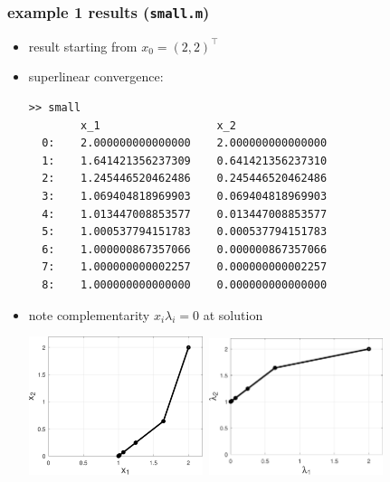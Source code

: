 \documentclass[10pt,hyperref,dvipsnames]{beamer}
\begin{document}
\begin{frame}[fragile]
\frametitle{example 1 results (\texttt{small.m})}

\begin{itemize}
\item result starting from $x_0=(2,2)^\top$
\item superlinear convergence:
\begin{Verbatim}[fontsize=\scriptsize]
>> small
        x_1                  x_2
  0:    2.000000000000000    2.000000000000000
  1:    1.641421356237309    0.641421356237310
  2:    1.245446520462486    0.245446520462486
  3:    1.069404818969903    0.069404818969903
  4:    1.013447008853577    0.013447008853577
  5:    1.000537794151783    0.000537794151783
  6:    1.000000867357066    0.000000867357066
  7:    1.000000000002257    0.000000000002257
  8:    1.000000000000000    0.000000000000000
\end{Verbatim}

\item note complementarity $x_i\lambda_i=0$ at solution

\medskip
\hfill
\mbox{\includegraphics[width=0.4\textwidth]{figs/small.pdf} \qquad \includegraphics[width=0.4\textwidth]{figs/smalldual.pdf}}
\end{itemize}
\end{frame}
\end{document}

